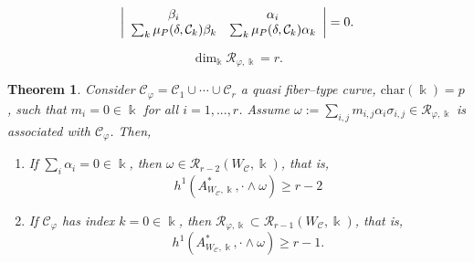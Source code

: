 \documentclass[10pt,a4paper]{amsart}
\newtheorem{thm}{Theorem}
\def\cC{\mathcal{C}}
\def\cR{{\mathcal R}}
\def\kk{\Bbbk}
\def\w{\omega}
\begin{document}
\begin{equation}
\label{eq:det}
\left| \array{cc} \beta_i & \alpha_i \\
\sum_k \mu_P(\delta,\cC_k)\beta_k & \sum_k \mu_P(\delta,\cC_k)\alpha_k \endarray \right|=0.
\end{equation}

\begin{equation}
\label{eq:R_phi}
\dim_\kk \cR_{\varphi,\kk} = r.
\end{equation}

\begin{thm}
\label{thm:fibered}
Consider $\cC_\varphi=\cC_1\cup\cdots\cup\cC_r$ a quasi fiber--type curve, $\mathrm{char}(\kk)=p$, 
such that $m_i=0\in\kk$ for all $i=1,...,r$. Assume $\omega:=\sum_{i,j} m_{i,j}\alpha_{i}\sigma_{i,j}\in\cR_{\varphi,\kk}$ is associated with $\cC_\varphi$. Then, 
\begin{enumerate}
    \item\label{thm:fibered:1} If $\sum_i \alpha_i=0\in\kk$,
then $\omega\in \cR_{r-2}(W_\cC,\kk)$, that is,
\begin{equation}
\label{eq:fibered:general}
h^1(A^*_{W_{\cC},\kk},\cdot\wedge\w)\geq r-2 
\end{equation}
    \item\label{thm:fibered:2} If $\cC_\varphi$ has index $k=0\in\kk$,
then $\cR_{\varphi,\kk}\subset \cR_{r-1}(W_\cC,\kk)$, that is,
\begin{equation}
\label{eq:fibered:indexp}
h^1(A^*_{W_{\cC},\kk},\cdot\wedge\w)\geq r-1.
\end{equation}
\end{enumerate}
\end{thm}
\end{document}
